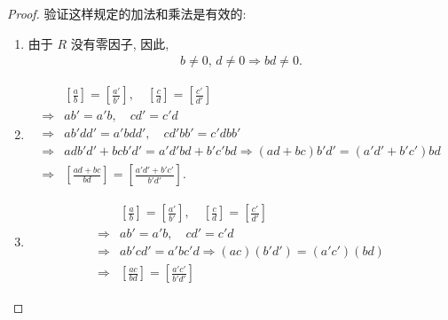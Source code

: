 \documentclass[utf8]{ctexbook}
\theoremstyle{definition}
\begin{document}
\begin{proof}
验证这样规定的加法和乘法是有效的:
\begin{enumerate}
\item{由于 $R$ 没有零因子, 因此, 
\begin{align*}
b \neq 0, \, d \neq 0 \Longrightarrow bd \neq 0 .
\end{align*}
}
\item{
\begin{align*}
& \left[ \frac{a}{b} \right] = \left[ \frac{a'}{b'} \right] , \quad \left[ \frac{c}{d} \right] = \left[ \frac{c'}{d'} \right] \\
\Longrightarrow & ab' = a' b, \quad cd' = c' d \\
\Longrightarrow & a b' d d' = a' b d d', \quad c d' bb' = c'd bb' \\
\Longrightarrow & a d b' d' + b c b' d' = a' d' b d + b' c' b d \Longrightarrow ( a d  + b c ) b' d' = (a' d'  + b' c') b d  \\
\Longrightarrow & \left[ \frac{a d  + b c }{b d} \right] =  \left[ \frac{a' d'  + b' c'}{b' d'} \right] .
\end{align*}
}
\item{
\begin{align*}
& \left[ \frac{a}{b} \right] = \left[ \frac{a'}{b'} \right] , \quad \left[ \frac{c}{d} \right] = \left[ \frac{c'}{d'} \right] \\
\Longrightarrow & ab' = a' b, \quad cd' = c' d \\
\Longrightarrow & ab' c d' = a'b c' d \Longrightarrow (ac)(b'd') = (a'c') (bd) \\
\Longrightarrow & \left[ \frac{a c }{b d} \right] =  \left[ \frac{a'  c'}{b' d'} \right]
\end{align*}
}
\end{enumerate}


\end{proof}
\end{document}
